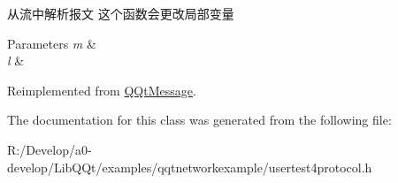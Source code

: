 从流中解析报文 这个函数会更改局部变量 


\begin{DoxyParams}{Parameters}
{\em m} & \\
\hline
{\em l} & \\
\hline
\end{DoxyParams}


Reimplemented from \mbox{\hyperlink{class_q_qt_message_a0bc25669bdd61490b1d8df6d77565f31}{Q\+Qt\+Message}}.



The documentation for this class was generated from the following file\+:\begin{DoxyCompactItemize}
\item 
R\+:/\+Develop/a0-\/develop/\+Lib\+Q\+Qt/examples/qqtnetworkexample/usertest4protocol.\+h\end{DoxyCompactItemize}
